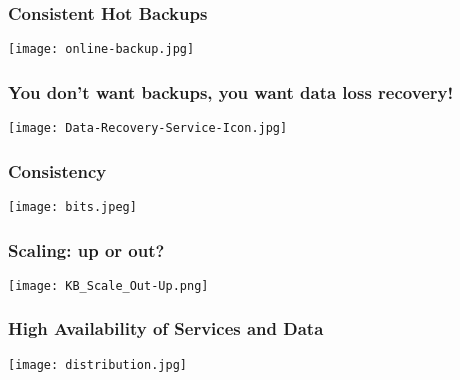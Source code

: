 \documentclass{beamer}
\begin{document}
\begin{frame}
  \frametitle{Consistent Hot Backups}


  \begin{center}
    \texttt{[image: online-backup.jpg]}
  \end{center}
\end{frame}

\begin{frame}
  \frametitle{You don't want backups, you want data loss recovery!}

  \begin{center}
    \texttt{[image: Data-Recovery-Service-Icon.jpg]}
  \end{center}
\end{frame}

\begin{frame}
  \frametitle{Consistency}


  \begin{center}
    \texttt{[image: bits.jpeg]}
  \end{center}
\end{frame}

\begin{frame}
  \frametitle{Scaling: up or out?}

  \begin{center}
    \texttt{[image: KB\_Scale\_Out-Up.png]}
  \end{center}
\end{frame}

\begin{frame}
  \frametitle{High Availability of Services and Data}

  \begin{center}
    \texttt{[image: distribution.jpg]}
  \end{center}
\end{frame}
\end{document}
